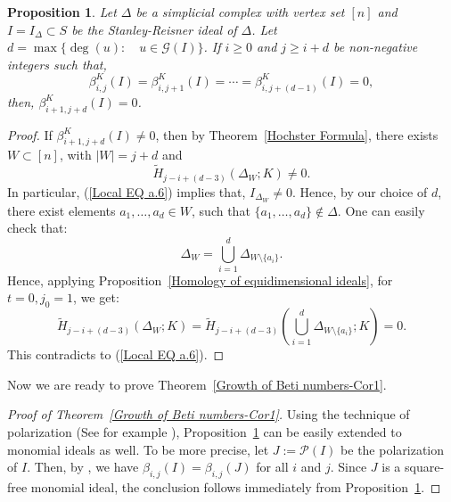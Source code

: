 \documentclass[a4paper,11pt]{amsart}
\theoremstyle{plain}
\newtheorem{prop}[thm]{Proposition}
\theoremstyle{definition}
\theoremstyle{remark}
\begin{document}
\begin{prop} \label{Growth of Beti numbers}
	Let $\Delta$ be a simplicial complex with vertex set $[n]$ and $I=I_\Delta \subset S$ be the Stanley-Reisner ideal of $\Delta$. Let $d = \max \{ \deg (u) \colon \quad u \in \mathcal{G}(I) \}$. If $i\geq 0$ and $j \geq i+d$ be non-negative integers such that,
	$$\beta^K_{i,j}(I) = \beta^K_{i,j+1}(I) = \cdots = \beta^K_{i,j+(d-1)}(I) = 0,$$
	then, $\beta^K_{i+1,j+d}(I) = 0$.
\end{prop}

\begin{proof}
	If $\beta^K_{i+1,j+d}(I) \neq 0$, then by Theorem~\ref{Hochster Formula}, there exists $W \subset [n]$, with $|W|=j+d$ and
	\begin{equation} \label{Local EQ a.6}
	\tilde{H}_{j-i+(d-3)}\left( \Delta_W; K \right) \neq 0.
	\end{equation}
	In particular, (\ref{Local EQ a.6}) implies that, $I_{\Delta_W} \neq 0$. Hence, by our choice of $d$, there exist elements $a_1, \ldots, a_d \in W$, such that $\{a_1, \ldots, a_d\} \notin \Delta$. One can easily check that:
	\begin{equation*}
	\Delta_W = \bigcup\limits_{i=1}^{d} \Delta_{W \setminus \{a_i\}}.
	\end{equation*}
	Hence, applying Proposition~\ref{Homology of equidimensional ideals}, for $t=0, j_0=1$, we get:
	\begin{equation*}
	\tilde{H}_{j-i+(d-3)}\left( \Delta_W; K \right) = \tilde{H}_{j-i+(d-3)}\left( \bigcup\limits_{i=1}^{d} \Delta_{W \setminus \{a_i\}}; K \right) = 0.
	\end{equation*}
	This contradicts to (\ref{Local EQ a.6}).
\end{proof}

Now we are ready to prove Theorem~\ref{Growth of Beti numbers-Cor1}.
\begin{proof}[Proof of Theorem~\ref{Growth of Beti numbers-Cor1}]

Using the technique of polarization (See for example \cite[Section 1.6]{HerzogHibi}), Proposition~\ref{Growth of Beti numbers} can be easily extended to monomial ideals as well. To be more precise, let $J:= \mathcal{P}(I) $ be the polarization of $I$. Then, by \cite[Corollary 1.6.3(a)]{HerzogHibi}, we have $\beta_{i,j}(I) = \beta_{i,j}(J)$ for all $i$ and $j$. Since $J$ is a square-free monomial ideal, the conclusion follows immediately from Proposition~\ref{Growth of Beti numbers}.
\end{proof}
\end{document}
